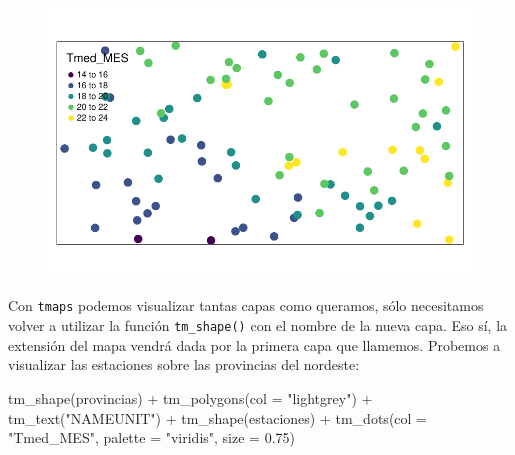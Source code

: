 \documentclass[
  letterpaper,
  DIV=11,
  numbers=noendperiod]{scrreprt}
\newenvironment{Shaded}{\begin{snugshade}}{\end{snugshade}}
\newcommand{\AttributeTok}[1]{\textcolor[rgb]{0.40,0.45,0.13}{#1}}
\newcommand{\FloatTok}[1]{\textcolor[rgb]{0.68,0.00,0.00}{#1}}
\newcommand{\FunctionTok}[1]{\textcolor[rgb]{0.28,0.35,0.67}{#1}}
\newcommand{\NormalTok}[1]{\textcolor[rgb]{0.00,0.23,0.31}{#1}}
\newcommand{\SpecialCharTok}[1]{\textcolor[rgb]{0.37,0.37,0.37}{#1}}
\newcommand{\StringTok}[1]{\textcolor[rgb]{0.13,0.47,0.30}{#1}}
\begin{document}
\begin{figure}[H]

{\centering \includegraphics{03_DatosEspaciales_files/figure-pdf/unnamed-chunk-14-1.pdf}

}

\end{figure}

Con \texttt{tmaps} podemos visualizar tantas capas como queramos, sólo
necesitamos volver a utilizar la función \texttt{tm\_shape()} con el
nombre de la nueva capa. Eso sí, la extensión del mapa vendrá dada por
la primera capa que llamemos. Probemos a visualizar las estaciones sobre
las provincias del nordeste:

\begin{Shaded}
\begin{Highlighting}[]
\FunctionTok{tm\_shape}\NormalTok{(provincias) }\SpecialCharTok{+}
    \FunctionTok{tm\_polygons}\NormalTok{(}\AttributeTok{col =} \StringTok{"lightgrey"}\NormalTok{) }\SpecialCharTok{+}
    \FunctionTok{tm\_text}\NormalTok{(}\StringTok{"NAMEUNIT"}\NormalTok{) }\SpecialCharTok{+}
\FunctionTok{tm\_shape}\NormalTok{(estaciones) }\SpecialCharTok{+}
    \FunctionTok{tm\_dots}\NormalTok{(}\AttributeTok{col =} \StringTok{"Tmed\_MES"}\NormalTok{, }\AttributeTok{palette =} \StringTok{"viridis"}\NormalTok{, }\AttributeTok{size =} \FloatTok{0.75}\NormalTok{)}
\end{Highlighting}
\end{Shaded}
\end{document}
